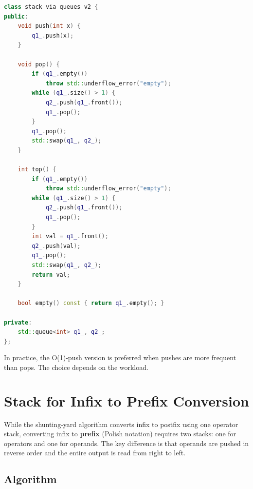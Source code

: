\begin{lstlisting}[language=C++]
class stack_via_queues_v2 {
public:
    void push(int x) {
        q1_.push(x);
    }

    void pop() {
        if (q1_.empty())
            throw std::underflow_error("empty");
        while (q1_.size() > 1) {
            q2_.push(q1_.front());
            q1_.pop();
        }
        q1_.pop();
        std::swap(q1_, q2_);
    }

    int top() {
        if (q1_.empty())
            throw std::underflow_error("empty");
        while (q1_.size() > 1) {
            q2_.push(q1_.front());
            q1_.pop();
        }
        int val = q1_.front();
        q2_.push(val);
        q1_.pop();
        std::swap(q1_, q2_);
        return val;
    }

    bool empty() const { return q1_.empty(); }

private:
    std::queue<int> q1_, q2_;
};
\end{lstlisting}

In practice, the O(1)-push version is preferred when pushes are more frequent than pops. The choice depends on the workload.

\section{Stack for Infix to Prefix Conversion}

While the shunting-yard algorithm converts infix to postfix using one operator stack, converting infix to \textbf{prefix} (Polish notation) requires two stacks: one for operators and one for operands. The key difference is that operands are pushed in reverse order and the entire output is read from right to left.

\subsection{Algorithm}


